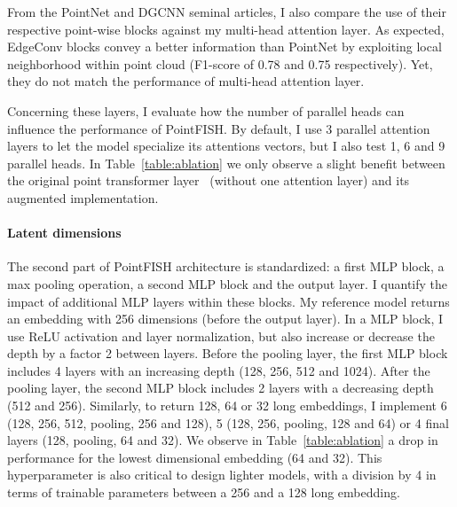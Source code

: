 From the PointNet and DGCNN seminal articles, I also compare the use of their respective point-wise blocks against my multi-head attention layer.
As expected, EdgeConv blocks convey a better information than PointNet by exploiting local neighborhood within point cloud (F1-score of 0.78 and 0.75 respectively).
Yet, they do not match the performance of multi-head attention layer.

Concerning these layers, I evaluate how the number of parallel heads can influence the performance of PointFISH.
By default, I use 3 parallel attention layers to let the model specialize its attentions vectors, but I also test 1, 6 and 9 parallel heads.
In Table~\ref{table:ablation} we only observe a slight benefit between the original point transformer layer~\cite{Zhao_2021_ICCV} (without one attention layer) and its augmented implementation.


\paragraph{Latent dimensions}

The second part of PointFISH architecture is standardized: a first MLP block, a max pooling operation, a second MLP block and the output layer.
I quantify the impact of additional MLP layers within these blocks.
My reference model returns an embedding with 256 dimensions (before the output layer).
In a MLP block, I use ReLU activation and layer normalization, but also increase or decrease the depth by a factor 2 between layers.
Before the pooling layer, the first MLP block includes 4 layers with an increasing depth (128, 256, 512 and 1024).
After the pooling layer, the second MLP block includes 2 layers with a decreasing depth (512 and 256).
Similarly, to return 128, 64 or 32 long embeddings, I implement 6 (128, 256, 512, pooling, 256 and 128), 5 (128, 256, pooling, 128 and 64) or 4 final layers (128, pooling, 64 and 32).
We observe in Table~\ref{table:ablation} a drop in performance for the lowest dimensional embedding (64 and 32).
This hyperparameter is also critical to design lighter models, with a division by 4 in terms of trainable parameters between a 256 and a 128 long embedding.

